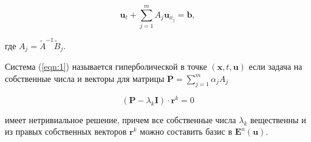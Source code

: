 		\begin{equation}
			\mathbf{u}_{t} + \sum_{j = 1}^{m} A_{j} \mathbf{u}_{x_{j}} = \mathbf{b},
			\label{eqn:1}
		\end{equation}

		где $A_{j} = \tilde{A}^{-1} \tilde{B}_{j}$.

		Система (\ref{eqn:1}) называется гиперболической в точке $\left( \mathbf{x}, t, \mathbf{u} \right)$ если задача на собственные числа и векторы для матрицы $\mathbf{P} = \sum_{j = 1}^{m} \alpha_{j} A_{j}$
		
		\begin{equation}
			\left( \mathbf{P} - \lambda_{k} \mathbf{I} \right) \cdot \mathbf{r}^{k} = 0
		\end{equation}
		
		имеет нетривиальное решение, причем все собственные числа $\lambda_{k}$ вещественны и из правых собственных векторов $ \mathbf{r}^{k}$ можно составить базис в $\mathbf{E}^{n} \left( \mathbf{u} \right)$.

		\newpage

